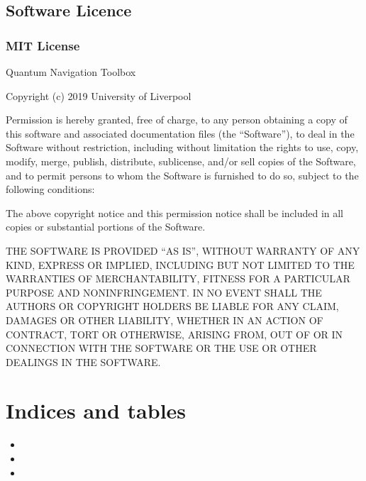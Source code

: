 \documentclass[letterpaper,10pt,english]{sphinxmanual}
\begin{document}
\sphinxstepscope


\section{Software Licence}
\label{\detokenize{usage/legal:software-licence}}\label{\detokenize{usage/legal::doc}}

\subsection{MIT License}
\label{\detokenize{usage/legal:mit-license}}
\sphinxAtStartPar
Quantum Navigation Toolbox

\sphinxAtStartPar
Copyright (c) 2019 University of Liverpool

\sphinxAtStartPar
Permission is hereby granted, free of charge, to any person obtaining a copy
of this software and associated documentation files (the “Software”), to deal
in the Software without restriction, including without limitation the rights
to use, copy, modify, merge, publish, distribute, sublicense, and/or sell
copies of the Software, and to permit persons to whom the Software is
furnished to do so, subject to the following conditions:

\sphinxAtStartPar
The above copyright notice and this permission notice shall be included in all
copies or substantial portions of the Software.

\sphinxAtStartPar
THE SOFTWARE IS PROVIDED “AS IS”, WITHOUT WARRANTY OF ANY KIND, EXPRESS OR
IMPLIED, INCLUDING BUT NOT LIMITED TO THE WARRANTIES OF MERCHANTABILITY,
FITNESS FOR A PARTICULAR PURPOSE AND NONINFRINGEMENT. IN NO EVENT SHALL THE
AUTHORS OR COPYRIGHT HOLDERS BE LIABLE FOR ANY CLAIM, DAMAGES OR OTHER
LIABILITY, WHETHER IN AN ACTION OF CONTRACT, TORT OR OTHERWISE, ARISING FROM,
OUT OF OR IN CONNECTION WITH THE SOFTWARE OR THE USE OR OTHER DEALINGS IN THE
SOFTWARE.


\chapter{Indices and tables}
\label{\detokenize{index:indices-and-tables}}\begin{itemize}
\item {} 
\sphinxAtStartPar
{}

\item {} 
\sphinxAtStartPar
{}

\item {} 
\sphinxAtStartPar
{}

\end{itemize}
\end{document}

